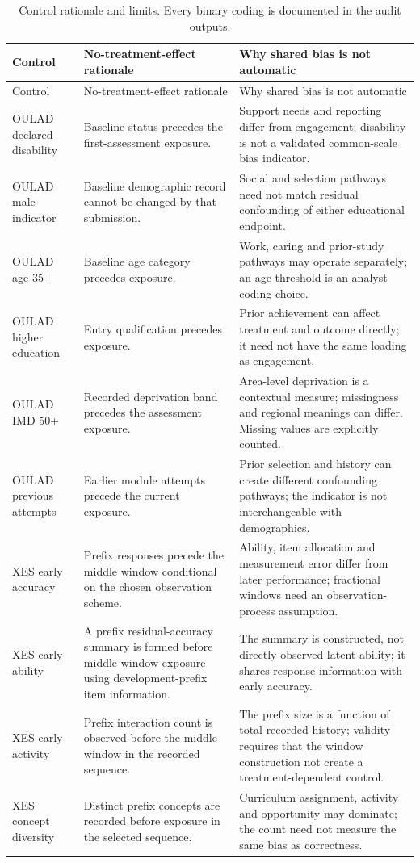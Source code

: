\begin{longtable}{p{}p{}p{}}
\caption{Control rationale and limits. Every binary coding is documented in the audit outputs.}\label{tab:control-rationale}\\
\toprule Control & No-treatment-effect rationale & Why shared bias is not automatic \\
\midrule\endfirsthead
\toprule Control & No-treatment-effect rationale & Why shared bias is not automatic \\
\midrule\endhead
OULAD declared disability & Baseline status precedes the first-assessment exposure. & Support needs and reporting differ from engagement; disability is not a validated common-scale bias indicator. \\
OULAD male indicator & Baseline demographic record cannot be changed by that submission. & Social and selection pathways need not match residual confounding of either educational endpoint. \\
OULAD age 35+ & Baseline age category precedes exposure. & Work, caring and prior-study pathways may operate separately; an age threshold is an analyst coding choice. \\
OULAD higher education & Entry qualification precedes exposure. & Prior achievement can affect treatment and outcome directly; it need not have the same loading as engagement. \\
OULAD IMD 50+ & Recorded deprivation band precedes the assessment exposure. & Area-level deprivation is a contextual measure; missingness and regional meanings can differ. Missing values are explicitly counted. \\
OULAD previous attempts & Earlier module attempts precede the current exposure. & Prior selection and history can create different confounding pathways; the indicator is not interchangeable with demographics. \\
XES early accuracy & Prefix responses precede the middle window conditional on the chosen observation scheme. & Ability, item allocation and measurement error differ from later performance; fractional windows need an observation-process assumption. \\
XES early ability & A prefix residual-accuracy summary is formed before middle-window exposure using development-prefix item information. & The summary is constructed, not directly observed latent ability; it shares response information with early accuracy. \\
XES early activity & Prefix interaction count is observed before the middle window in the recorded sequence. & The prefix size is a function of total recorded history; validity requires that the window construction not create a treatment-dependent control. \\
XES concept diversity & Distinct prefix concepts are recorded before exposure in the selected sequence. & Curriculum assignment, activity and opportunity may dominate; the count need not measure the same bias as correctness. \\
\bottomrule
\end{longtable}

